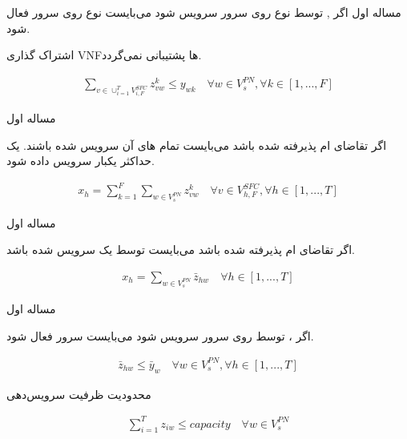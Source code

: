 \documentclass{beamer}
\begin{document}
\begin{persian}
\begin{frame}{مساله اول}
	اگر , 
	توسط  نوع 
	روی سرور  سرویس شود می‌بایست
	 نوع 
	روی سرور  فعال شود.
	\par
	اشتراک گذاری VNFها پشتیبانی نمی‌گردد.
	\begin{latin}\begin{align}
	\sum_{v \in \cup_{i=1}^T V_{i, F}^{SFC}} z_{vw}^k \le y_{wk}
	\quad
	\forall w \in V_s^{PN}, \forall k \in [1, ..., F]
	\end{align}\end{latin}
\end{frame}
\begin{frame}{مساله اول}
	\par
	اگر تقاضای ام پذیرفته شده باشد
	می‌بایست تمام های آن‌
	سرویس شده باشند.
	یک  حداکثر یکبار سرویس داده شود.
	\begin{latin}\begin{align}
		x_h = \sum_{k=1}^{F} \sum_{w \in V_{s}^{PN}} z_{vw}^{k}
		\quad
		\forall v \in V_{h,F}^{SFC}, \forall h \in [1, ..., T]
	\end{align}\end{latin}
\end{frame}
\begin{frame}{مساله اول}
	\par
	اگر تقاضای ام پذیرفته شده باشد
	می‌بایست توسط یک  سرویس شده باشد.
	\begin{latin}\begin{align}
		x_h = \sum_{w \in V_{s}^{PN}} \bar{z}_{hw}
		\quad
		\forall h \in [1, ..., T]
	\end{align}\end{latin}
\end{frame}
\begin{frame}{مساله اول}
	\par
	اگر ، 
	توسط  روی سرور 
	سرویس شود می‌بایست  سرور 
	فعال شود.
	\begin{latin}\begin{align}
		\bar{z}_{hw} \le \bar{y}_w
		\quad
		\forall w \in V_{s}^{PN}, \forall h \in [1, ..., T]
	\end{align}\end{latin}
	\par
	محدودیت ظرفیت سرویس‌دهی 
	\begin{latin}\begin{align}
		\sum_{i=1}^{T} z_{iw} \le capacity
		\quad
		\forall w \in V_{s}^{PN}
	\end{align}\end{latin}

\end{frame}
\end{persian}
\end{document}
